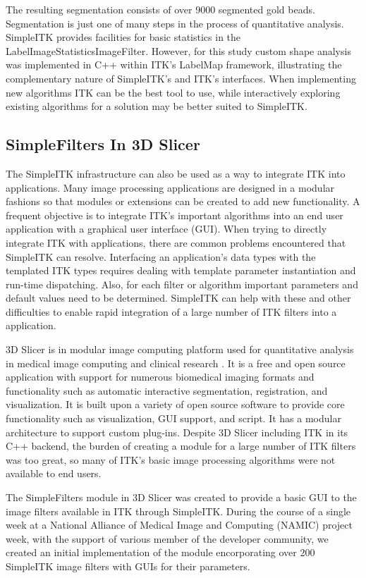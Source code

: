 \documentclass{frontiersMED} %
\begin{document}
The resulting segmentation consists of over 9000 segmented gold
beads. Segmentation is just one of many steps in the process of
quantitative analysis. SimpleITK provides facilities for basic
statistics in the LabelImageStatisticsImageFilter. However, for this
study custom shape analysis was implemented in C++
within ITK's LabelMap framework, illustrating the complementary
nature of SimpleITK's and ITK's interfaces. When implementing new
algorithms ITK can be the best tool to use, while interactively
exploring existing algorithms for a solution may be better suited to
SimpleITK.

\subsection{SimpleFilters In 3D Slicer}
The SimpleITK infrastructure can also be used as a way to integrate
ITK into applications. Many image processing applications are designed
in a modular fashions so that modules or extensions can be created to
add new functionality. A frequent objective is to integrate ITK's
important algorithms into an end user application with a graphical
user interface (GUI). When trying to directly integrate ITK with
applications, there are common problems encountered that SimpleITK can
resolve. Interfacing an application's data types with
the templated ITK types requires dealing with template parameter
instantiation and run-time dispatching. Also, for each filter or algorithm
important parameters and default values need to be
determined. SimpleITK can help with these and other difficulties to
enable rapid integration of a large number of ITK filters into a
application.

3D Slicer is in modular image computing platform used for quantitative
analysis in medical image computing and clinical research
\cite{Fedorov2012}. It is a free and open source application with support
for numerous biomedical imaging formats and functionality such as
automatic interactive segmentation, registration, and
visualization. It is built upon a variety of open source software
to provide core functionality such as visualization, GUI
support, and script. It has a modular
architecture to support custom plug-ins. Despite 3D Slicer including ITK
in its C++ backend, the burden of creating a module for a large number of ITK
filters was too great, so many of ITK's basic image processing algorithms
were not available to end users.

The SimpleFilters module in 3D Slicer was created to provide a basic
GUI to the image filters available in ITK through SimpleITK. During
the course of a single week at a National Alliance of Medical Image
and Computing (NAMIC) project week, with the support of various member
of the developer community, we created an initial implementation of the module
encorporating over 200 SimpleITK image filters with GUIs
for their parameters.
\end{document}
